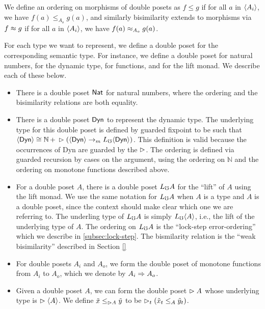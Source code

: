 
We define an ordering on morphisms of double posets as
$f \le g$ if for all $a$ in $\langle {A_i} \rangle$, we have $f(a) \le_{A_o} g(a)$,
and similarly bisimilarity extends to morphisms via
$f \approx g$ if for all $a$ in $\langle {A_i} \rangle$, we have $f(a) \approx_{A_o} g(a)$.

For each type we want to represent, we define a double poset for the corresponding semantic
type. For instance, we define a double poset for natural numbers, for the
dynamic type, for functions, and for the lift monad. We
describe each of these below.

\begin{itemize}
  \item There is a double poset $\mathsf{Nat}$ for natural numbers, where the ordering and the
  bisimilarity relations are both equality.
  
  \item There is a double poset $\mathsf{Dyn}$ to represent the dynamic type. The underlying type
  for this double poset is defined by guarded fixpoint to be such that
  $\langle {\mathsf{Dyn}} \rangle \cong \mathbb{N}\, +\, \vartriangleright (\langle {\mathsf{Dyn}} \rangle \to_m L_\mho \langle {\mathsf{Dyn}} \rangle)$.
  This definition is valid because the occurrences of Dyn are guarded by the $\vartriangleright$.
  The ordering is defined via guarded recursion by cases on the argument, using the
  ordering on $\mathbb{N}$ and the ordering on monotone functions described above.

  \item For a double poset $A$, there is a double poset $L_\mho A$ for the ``lift'' of $A$
  using the lift monad. We use the same notation for $L_\mho A$ when $A$ is a type
  and $A$ is a double poset, since the context should make clear which one we are referring to.
  The underling type of $L_\mho A$ is simply $L_\mho \langle {A} \rangle$, i.e., the lift of the underlying
  type of $A$.
  The ordering on $L_\mho A$ is the ``lock-step error-ordering'' which we describe in
  \ref{subsec:lock-step}. The bismilarity relation is the ``weak bisimilarity''
  described in Section \ref{}

  \item For double posets $A_i$ and $A_o$, we form the double poset of monotone functions
  from $A_i$ to $A_o$, which we denote by $A_i \Rightarrow A_o$.

  \item Given a double poset $A$, we can form the double poset $\vartriangleright A$ whose underlying
  type is $\vartriangleright \langle {A} \rangle$. We define $\tilde{x} \le_{\vartriangleright A} \tilde{y}$ to be
  $\vartriangleright_t (\tilde{x}_t \le_A \tilde{y}_t)$.
\end{itemize}

